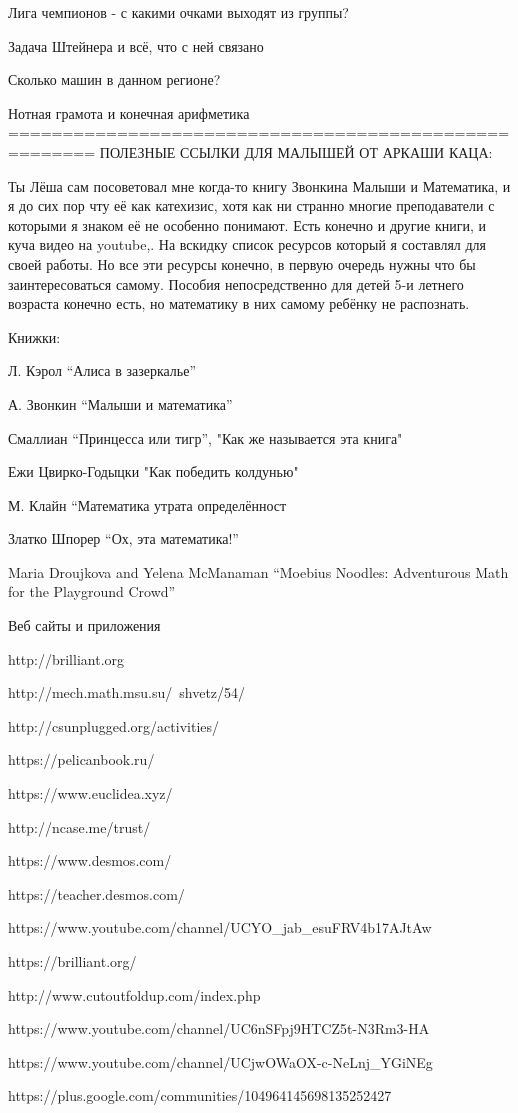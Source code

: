 Лига чемпионов - с какими очками выходят из группы?

Задача Штейнера и всё, что с ней связано

Сколько машин в данном регионе?

Нотная грамота и конечная арифметика
======================================================
ПОЛЕЗНЫЕ ССЫЛКИ ДЛЯ МАЛЫШЕЙ ОТ АРКАШИ КАЦА:

Ты Лёша сам посоветовал мне когда-то книгу Звонкина Малыши и Математика, и я до сих пор чту её как катехизис, хотя как ни странно многие преподаватели с которыми я знаком её не особенно понимают. Есть конечно и другие книги, и куча видео на youtube,. На вскидку список ресурсов который я составлял для своей работы. Но все эти ресурсы конечно, в первую очередь нужны что бы заинтересоваться самому. Пособия непосредственно для детей 5-и летнего возраста конечно есть, но математику в них самому ребёнку не распознать.
 
Книжки:

    Л. Кэрол “Алиса в зазеркалье”

    А. Звонкин “Малыши и математика”

    Смаллиан “Принцесса или тигр”, "Как же называется эта книга"

    Ежи Цвирко-Годыцки "Как победить колдунью"

    М. Клайн “Математика утрата определённост

    Златко Шпорер “Ох, эта математика!” 

    Maria Droujkova and Yelena McManaman “Moebius Noodles: Adventurous Math for the Playground Crowd”
     
Веб  сайты и приложения
 
    http://brilliant.org 

    http://mech.math.msu.su/~shvetz/54/

    http://csunplugged.org/activities/

    https://pelicanbook.ru/

    https://www.euclidea.xyz/

    http://ncase.me/trust/

    https://www.desmos.com/

    https://teacher.desmos.com/ 

    https://www.youtube.com/channel/UCYO_jab_esuFRV4b17AJtAw 

    https://brilliant.org/ 

    http://www.cutoutfoldup.com/index.php 

    https://www.youtube.com/channel/UC6nSFpj9HTCZ5t-N3Rm3-HA 

    https://www.youtube.com/channel/UCjwOWaOX-c-NeLnj_YGiNEg

    https://plus.google.com/communities/104964145698135252427 
